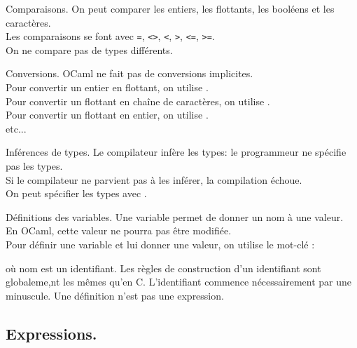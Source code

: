 \documentclass[french, 11pt]{article}
\begin{document}
\begin{defi}{Comparaisons.}{}
    On peut comparer les entiers, les flottants, les booléens et les caractères.\\
    Les comparaisons se font avec \texttt{=}, \texttt{<>}, \texttt{<}, \texttt{>}, \texttt{<=}, \texttt{>=}.\\
    On ne compare pas de types différents.
\end{defi}

\begin{defi}{Conversions.}{}
    OCaml ne fait pas de conversions implicites.\\
    Pour convertir un entier en flottant, on utilise .\\
    Pour convertir un flottant en chaîne de caractères, on utilise .\\
    Pour convertir un flottant en entier, on utilise .\\
    etc...
\end{defi}

\begin{defi}{Inférences de types.}{}
    Le compilateur infère les types: le programmeur ne spécifie pas les types.\\
    Si le compilateur ne parvient pas à les inférer, la compilation échoue.\\
    On peut spécifier les types avec .
\end{defi}

\begin{defi}{Définitions des variables.}{}
    Une variable permet de donner un nom à une valeur. En OCaml, cette valeur ne pourra pas être modifiée.\\
    Pour définir une variable et lui donner une valeur, on utilise le mot-clé :
    \begin{center}
    \end{center}
    où nom est un identifiant. Les règles de construction d'un identifiant sont globaleme,nt les mêmes qu'en C. L'identifiant commence nécessairement par une minuscule.\n
    Une définition n'est pas une expression. 
\end{defi}

\subsection{Expressions.}
\end{document}
